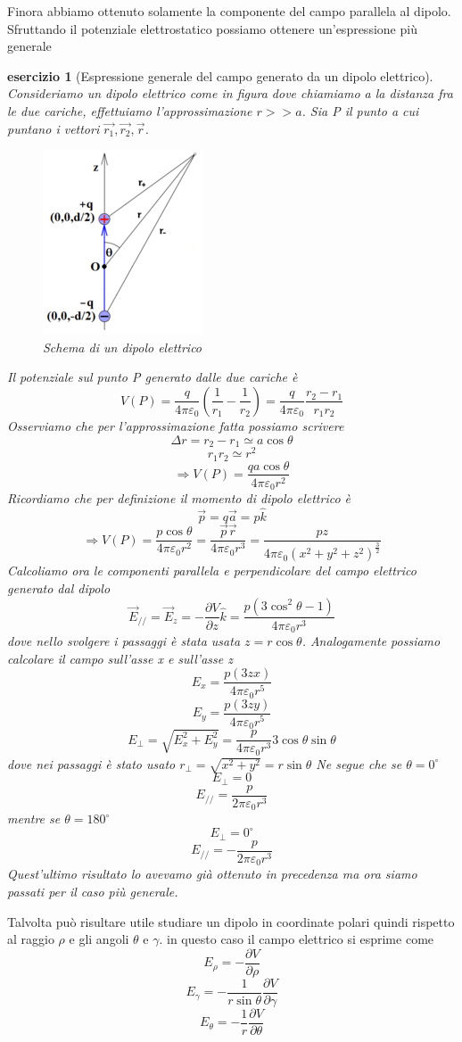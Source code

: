 \documentclass[10pt,a4paper]{article}
\newtheorem{esercizio}{esercizio}
\begin{document}
Finora abbiamo ottenuto solamente la componente del campo parallela al dipolo. Sfruttando il potenziale elettrostatico possiamo ottenere un'espressione più generale
\begin{esercizio}[Espressione generale del campo generato da un dipolo elettrico]
	Consideriamo un dipolo elettrico come in figura dove chiamiamo a la distanza fra le due cariche, effettuiamo l'approssimazione \(r>>a\). Sia P il punto a cui puntano i vettori \(\vec{r_1}, \vec{r_2}, \vec{r}\). 
	\begin{figure}[h!]
		\centering
		\includegraphics[width=0.4\linewidth]{images/dipolo}
		\caption{Schema di un dipolo elettrico}
		\label{fig:dipolo}
	\end{figure}
	\FloatBarrier
	Il potenziale sul punto P generato dalle due cariche è
	\[V(P) = \frac{q}{4\pi\varepsilon_0}\left(\frac{1}{r_1}-\frac{1}{r_2}\right) =  \frac{q}{4\pi\varepsilon_0}\frac{r_2-r_1}{r_1r_2}\]
	Osserviamo che per l'approssimazione fatta possiamo scrivere
	\[\Delta r = r_2-r_1 \simeq a\cos\theta\]
	\[r_1r_2 \simeq r^2\]
	\[\Rightarrow V(P) = \frac{q a \cos\theta}{4\pi\varepsilon_0 r^2}\]
	Ricordiamo che per definizione il momento di dipolo elettrico è
	\[\vec{p} = q\vec{a} = p\hat{k}\]
	\[\Rightarrow V(P) = \frac{p \cos\theta}{4\pi\varepsilon_0 r^2} = \frac{\vec{p}\vec{r}}{4\pi\varepsilon_0 r^3} = \frac{pz}{4\pi\varepsilon_0 (x^2+y^2+z^2)^{\frac{3}{2}}}\]
	Calcoliamo ora le componenti parallela e perpendicolare del campo elettrico generato dal dipolo
	\[\vec{E}_{//} = \vec{E}_z = -\frac{\partial V}{\partial z} \hat{k} = \frac{p(3\cos^2\theta-1)}{4\pi\varepsilon_0 r^3}\]
	dove nello svolgere i passaggi è stata usata \(z = r\cos\theta\). Analogamente possiamo calcolare il campo sull'asse x e sull'asse z 
	\[E_x = \frac{p(3zx)}{4\pi\varepsilon_0 r^5}\]
	\[E_y = \frac{p(3zy)}{4\pi\varepsilon_0 r^5}\]
	\[E_{\perp} = \sqrt{E_x^2+E_y^2} = \frac{p}{4\pi\varepsilon_0r^3}3\cos\theta\sin\theta\]
	dove nei passaggi è stato usato \(r_{\perp} = \sqrt{x^2+y^2} = r\sin\theta\)
	Ne segue che se \(\theta = 0^\circ \)
	\[E_{\perp} = 0\]
	\[E_{//} = \frac{p}{2\pi\varepsilon_0r^3}\]
	mentre se \(\theta = 180^\circ\)
	\[E_{\perp} = 0^\circ\]
	\[E_{//} = -\frac{p}{2\pi\varepsilon_0r^3}\]
	Quest'ultimo risultato lo avevamo già ottenuto in precedenza ma ora siamo passati per il caso più generale.
\end{esercizio}
Talvolta può risultare utile studiare un dipolo in coordinate polari quindi rispetto al raggio $\rho$ e gli angoli $\theta$ e $\gamma$. in questo caso il campo elettrico si esprime come 
\[E_\rho = -\frac{\partial V}{\partial \rho}\]
\[E_\gamma = -\frac{1}{r\sin\theta}\frac{\partial V}{\partial \gamma}\]
\[E_\theta = -\frac{1}{r}\frac{\partial V}{\partial \theta}\]
\end{document}
